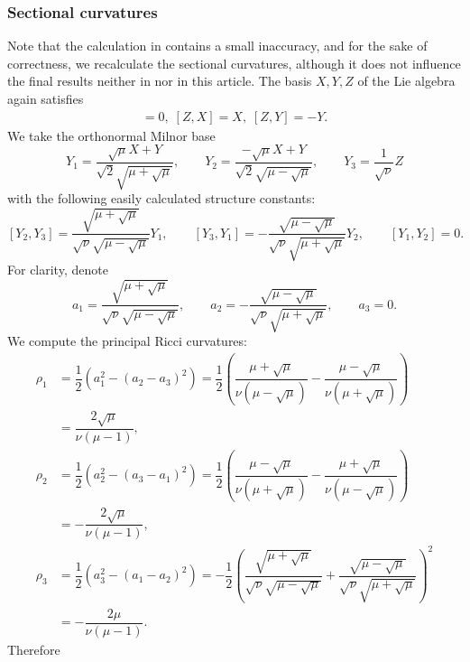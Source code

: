 \documentclass[12pt]{article}
\begin{document}
\subsubsection{Sectional curvatures}
Note that the calculation in \cite{KHL} contains a small inaccuracy, and for the sake of correctness, we recalculate the sectional curvatures, although it does not influence the final results  neither in \cite{KHL} nor in this article.
 The basis $X,Y,Z$ of the Lie algebra again satisfies
\begin{align*}
    [X,Y] = 0, \; [Z,X] = X,\; [Z,Y] = -Y.
\end{align*}
We take the orthonormal Milnor base
$$
Y_1 =
\dfrac{\sqrt{\mu}X+Y}{\sqrt{2}\sqrt{\mu+\sqrt{\mu}}},
\qquad
Y_2 =
\dfrac{-\sqrt{\mu}X+Y}{\sqrt{2}\sqrt{\mu-\sqrt{\mu}}},
\qquad
Y_3 =
\dfrac{1}{\sqrt{\nu}}Z
$$
with the following easily calculated structure constants:
$$
[Y_2,Y_3]
=
\dfrac{\sqrt{\mu+\sqrt{\mu}}}{\sqrt{\nu}\sqrt{\mu-\sqrt{\mu}}}Y_1,
\qquad
[Y_3,Y_1]
=
-\dfrac{\sqrt{\mu-\sqrt{\mu}}}{\sqrt{\nu}\sqrt{\mu+\sqrt{\mu}}}Y_2,
\qquad
[Y_1,Y_2]=0.
$$
For clarity, denote
$$
a_1=
\dfrac{\sqrt{\mu+\sqrt{\mu}}}{\sqrt{\nu}\sqrt{\mu-\sqrt{\mu}}},
\qquad
a_2=
-\dfrac{\sqrt{\mu-\sqrt{\mu}}}{\sqrt{\nu}\sqrt{\mu+\sqrt{\mu}}},
\qquad
a_3=0.
$$
 We compute the principal Ricci curvatures:
\begin{align*}
    \rho_1
    &=
    \dfrac{1}{2}\left(a_1^2-(a_2-a_3)^2\right) =
    \dfrac{1}{2}\left(
    \dfrac{\mu+\sqrt{\mu}}{\nu(\mu-\sqrt{\mu})}
    -
    \dfrac{\mu-\sqrt{\mu}}{\nu(\mu+\sqrt{\mu})}
    \right) \\
    &=
    \dfrac{2\sqrt{\mu}}{\nu(\mu-1)}, \\[1em]
    \rho_2
    &=
    \dfrac{1}{2}\left(a_2^2-(a_3-a_1)^2\right) =
    \dfrac{1}{2}\left(
    \dfrac{\mu-\sqrt{\mu}}{\nu(\mu+\sqrt{\mu})}
    -     \dfrac{\mu+\sqrt{\mu}}{\nu(\mu-\sqrt{\mu})}
    \right) \\
    &=
    -\dfrac{2\sqrt{\mu}}{\nu(\mu-1)}, \\[1em]
    \rho_3
    &=
    \dfrac{1}{2}\left(a_3^2-(a_1-a_2)^2\right) =
    -\dfrac{1}{2}
    \left(
    \dfrac{\sqrt{\mu+\sqrt{\mu}}}{\sqrt{\nu}\sqrt{\mu-\sqrt{\mu}}}
    +
    \dfrac{\sqrt{\mu-\sqrt{\mu}}}{\sqrt{\nu}\sqrt{\mu+\sqrt{\mu}}}
    \right)^2 \\
    &=
    -\dfrac{2\mu}{\nu(\mu-1)}.
\end{align*}
Therefore
\end{document}
